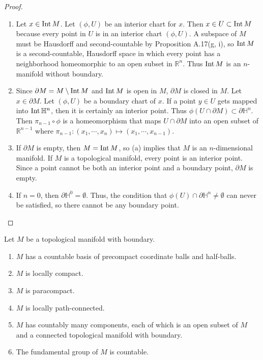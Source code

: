 \begin{proof}
  $ $
  \begin{enumerate}[label=(\alph*)]
    \item
      Let $x \in \operatorname{Int} M$.
      Let $(\phi, U)$ be an interior chart for $x$.
      Then $x \in U \subset \operatorname{Int} M$ because every point in $U$ is in an interior chart $(\phi, U)$.
      A subspace of $M$ must be Hausdorff and second-countable by Proposition A.17(g, i), so $\operatorname{Int} M$ is a second-countable, Hausdorff space in which every point has a neighborhood homeomorphic to an open subset in $\mathbb{R}^n$.
      Thus $\operatorname{Int} M$ is an $n$-manifold without boundary.
    \item
      Since $\partial M = M \setminus \operatorname{Int} M$ and $\operatorname{Int} M$ is open in $M$, $\partial M$ is closed in $M$.
      Let $x \in \partial M$.
      Let $(\phi, U)$ be a boundary chart of $x$.
      If a point $y \in U$ gets mapped into $\operatorname{Int} \mathbb{H}^n$, then it is certainly an interior point.
      Thus $\phi(U \cap \partial M) \subset \partial \mathbb{H}^n$.
      Then $\pi_{n - 1} \circ \phi$ is a homeomorphism that maps $U \cap \partial M$ into an open subset of $\mathbb{R}^{n - 1}$ where $\pi_{n - 1}: (x_1, \cdots, x_n) \mapsto (x_1, \cdots, x_{n - 1 })$.
    \item
      If $\partial M$ is empty, then $M = \operatorname{Int} M$, so (a) implies that $M$ is an $n$-dimensional manifold.
      If $M$ is a topological manifold, every point is an interior point.
      Since a point cannot be both an interior point and a boundary point, $\partial M$ is empty.
    \item
      If $n = 0$, then $\partial \mathbb{H}^0 = \emptyset$.
      Thus, the condition that $\phi(U) \cap \partial \mathbb{H}^n \ne \emptyset$ can never be satisfied, so there cannot be any boundary point.
  \end{enumerate}
\end{proof}

\begin{customexer}{1.41}\label{exercise_1_41}
  Let $M$ be a topological manifold with boundary.
  \begin{enumerate}[label=(\alph*)]
    \item
      $M$ has a countable basis of precompact coordinate balls and half-balls.
    \item
      $M$ is locally compact.
    \item
      $M$ is paracompact.
    \item
      $M$ is locally path-connected.
    \item
      $M$ has countably many components, each of which is an open subset of $M$ and a connected topological manifold with boundary.
    \item
      The fundamental group of $M$ is countable.
  \end{enumerate}
\end{customexer}

